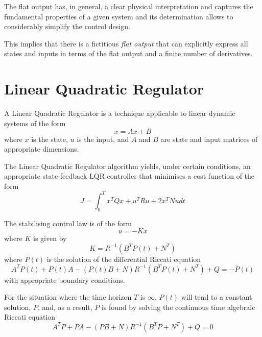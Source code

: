 \par The flat output has, in general, a clear physical interpretation and captures the fundamental properties of a given system and its determination allows to considerably simplify the control design. 
\par This implies that there is a fictitious \textit{flat output} that can explicitly express all states and inputs in terms of the flat output and a finite number of derivatives. 

\section{Linear Quadratic Regulator}

\par A Linear Quadratic Regulator is a technique applicable to linear dynamic systems of the form
\begin{equation}
    \label{eq:dynamic_system}
    \dot{x} = A x + B
\end{equation}
where $x$ is the state, $u$ is the input, and $A$ and $B$ are state and input matrices of appropriate dimensions. 

\par The Linear Quadratic Regulator algorithm yields, under certain conditions, an appropriate state-feedback LQR controller that minimises a cost function of the form
\begin{equation}
    \label{eq:quadratic_cost}
    J = \int_0^T x^T Q x + u^T R u + 2x^T N u dt
\end{equation}

\par The stabilising control law is of the form
\begin{equation}
    \label{eq:feedback}
    u = -Kx
\end{equation}
where $K$ is given by
\begin{equation}
    \label{eq:k_expression}
    K = R^{-1} (B^T P(t) + N^T)
\end{equation}
where $P(t)$ is the solution of the differential Riccati equation 
\begin{equation}
    \label{eq:p_diff_expression}
    A^T P(t) + P(t) A - (P(t) B + N) R^{-1} (B^T P(t) + N^T) + Q = - \overline{P}(t)
\end{equation}
with appropriate boundary conditions.

\par For the situation where the time horizon $T$ is $\infty$, $P(t)$ will tend to a constant solution, $P$, and, as a result, $P$ is found by solving the continuous time algebraic Riccati equation 
\begin{equation}
    \label{eq:p_expression}
    A^T P + PA - (PB + N) R^{-1} (B^T P + N^T) + Q = 0
\end{equation}

